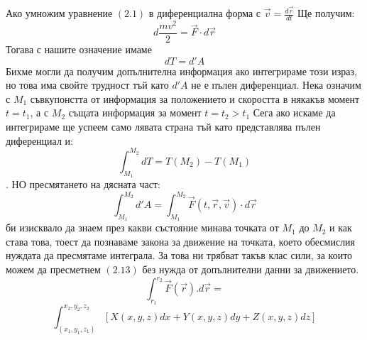 \documentclass{report}
\begin{document}
Ако умножим уравнение $(2.1)$ в диференциална форма с $\vec{v}=\frac{d\vec{r}}{dt}$ Ще получим:
\begin{equation}
    d\frac{mv^2}{2}=\vec{F}\cdot d\vec{r}
\end{equation}
Тогава с нашите означение имаме \begin{equation}
    dT=d'A
\end{equation}
Бихме могли да получим допълнителна информация ако интегрираме този израз, но това има свойте трудност тъй като $d'A$ не е пълен диференциал. \newline Нека означим с $M_1$ съвкупонстта от информация за положението  и скоростта в някакъв момент $t=t_1$, а с $M_2$ същата информация за момент $t=t_2>t_1$
Сега ако искаме да интегрираме ще успеем само лявата страна тъй като представлява пълен диференциал и:
\begin{equation}\int_{M_1}^{M_2}dT=T(M_2)-T(M_1)\end{equation}. \newline 
НО пресмятането на дясната част:\begin{equation}\int_{M_1}^{M_2}d'A=\int_{M_1}^{M_2}\vec{F}(t,\vec{r}, \vec{v})\cdot d\vec{r}\end{equation} би изисквало да знаем през какви състояние минава точката от $M_1$ до $M_2$ и как става това, тоест да познаваме закона за движение на точката, което обесмислия нуждата да пресмятаме интеграла.
\newline За това ни трябват такъв клас сили, за които можем  да пресметнем $(2.13)$ без нужда от допълнителни данни за движението.
\begin{equation}
    \int_{r_1}^{r_2}\vec{F}(\vec{r}).d\vec{r}=
\end{equation}
\begin{equation}
    \int_{(x_1,y_1,z_1)}^{x_2,y_2,z_2}[X(x,y,z)dx+Y(x,y,z)dy+Z(x,y,z)dz]
\end{equation}
\end{document}
